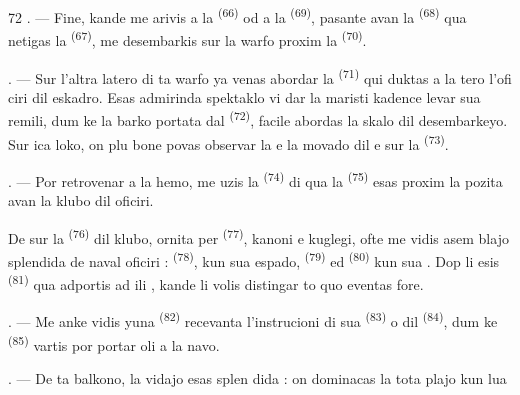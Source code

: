 \begin{VUpage}[74]{72}
. --- Fine, kande me arivis a la \cc
{} \textsuperscript{(66)} od a la  \textsuperscript{(69)}, pasante avan la\nl
{} \textsuperscript{(68)} qua netigas la  \textsuperscript{(67)}, me\nl
desembarkis sur la warfo proxim la \cc
{} \textsuperscript{(70)}.

. --- Sur l'altra latero di ta warfo ya venas\nl
abordar la  \textsuperscript{(71)} qui duktas a la tero l'ofi\cc
ciri dil eskadro. Esas admirinda spektaklo vi\cc
dar la maristi kadence levar sua remili, dum\nl
ke la barko portata dal  \textsuperscript{(72)}, facile abordas\nl
la skalo dil desembarkeyo. Sur ica loko, on\nl
plu bone povas observar la  e la movado\nl
dil  e  sur la  \textsuperscript{(73)}.

\VUsaut{3.0mm}
\VUsaut{3.0mm}

. --- Por retrovenar a la hemo, me uzis la\nl
{} \textsuperscript{(74)} di qua la  \textsuperscript{(75)}\nl
esas proxim la  pozita avan la klubo dil\nl
oficiri.

\VUblancAlinea
De sur la  \textsuperscript{(76)} dil klubo, ornita per\nl
{} \textsuperscript{(77)}, kanoni e kuglegi, ofte me vidis asem\cc
blajo splendida de naval oficiri :  \textsuperscript{(78)},\nl
kun sua espado,  \textsuperscript{(79)} ed \cc
{} \textsuperscript{(80)} kun sua . Dop li esis \cc
{} \textsuperscript{(81)} qua adportis ad ili , kande li volis\nl
distingar to quo eventas fore.

. --- Me anke vidis yuna  \textsuperscript{(82)}\nl
recevanta l'instrucioni di sua  \textsuperscript{(83)}\nl
o dil  \textsuperscript{(84)}, dum ke  \textsuperscript{(85)}\nl
vartis por portar oli a la navo.

. --- De ta balkono, la vidajo esas splen\cc
dida : on dominacas la tota plajo kun lua
\parplein
\end{VUpage}

